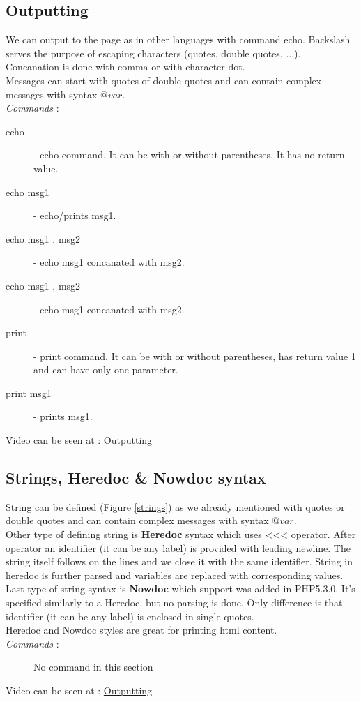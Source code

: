\documentclass{article}
\begin{document}
\subsection{Outputting}
We can output to the page as in other languages with command echo. Backslash serves 
the purpose of escaping characters (quotes, double quotes, ...). Concanation is done
with comma or with character dot.\\
Messages can start with quotes of double quotes and can contain
complex messages with syntax ${@var}$. \\
\textit{Commands} : 
\begin{description}
\item[\hspace{1cm} echo] - echo command. It can be with or without parentheses. It has no return value.
\item[\hspace{1cm} echo msg1] - echo/prints msg1.
\item[\hspace{1cm} echo msg1 . msg2] - echo msg1 concanated with msg2.
\item[\hspace{1cm} echo msg1 , msg2] - echo msg1 concanated with msg2.
\item[\hspace{1cm} print] - print command. It can be with or without parentheses, has return value 1 and can have only one parameter.
\item[\hspace{1cm} print msg1] - prints msg1. 
\end{description}
Video can be seen at : \href{http://youtu.be/ZbRG9KQBbts}{Outputting}

\subsection{Strings, Heredoc \& Nowdoc syntax}
String can be defined (Figure \hyperref[strings]{\ref{strings}}) as we already mentioned with quotes or double quotes and can contain complex messages with syntax ${@var}$. \\
Other type of defining string is \textbf{Heredoc} syntax which uses <<< operator. After operator an identifier (it can be any label) is provided with leading newline. The string itself follows on the lines and we close it with the same identifier. String in heredoc is further parsed and variables are replaced with corresponding values.\\
Last type of string syntax is \textbf{Nowdoc} which support was added in PHP5.3.0. It's specified similarly to a Heredoc, but no parsing is done.
Only difference is that identifier (it can be any label) is enclosed in single quotes. \\
Heredoc and Nowdoc styles are great for printing html content. \\
\textit{Commands} :
\begin{description}
\item[\hspace{1cm}] No command in this section
\end{description}
Video can be seen at : \href{http://youtu.be/ZbRG9KQBbts}{Outputting}
\end{document}
